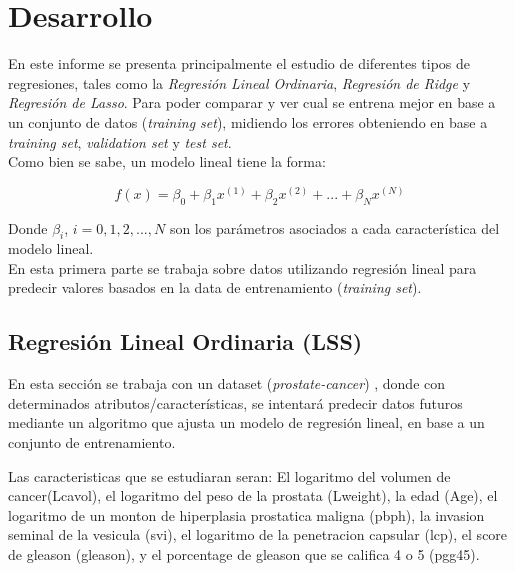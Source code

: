\documentclass[10pt]{article}
\begin{document}
\section*{Desarrollo}
En este informe se presenta principalmente el estudio de diferentes tipos de regresiones, tales como la \textit{Regresión Lineal Ordinaria}, \textit{Regresión de Ridge} y \textit{Regresión de Lasso}. Para poder comparar y ver cual se entrena mejor en base a un conjunto de datos (\textit{training set}), midiendo los errores obteniendo en base a \textit{training set}, \textit{validation set} y \textit{test set}.\\

Como bien se sabe, un modelo lineal tiene la forma:

\begin{equation}
f(x) = \beta_0 + \beta_1 x^{(1)} + \beta_2 x^{(2)} + ... + \beta_N x^{(N)}
\label{f_rlineal}
\end{equation}

Donde $\beta_i$, $i = 0, 1, 2,..., N$ son los parámetros asociados a cada característica del modelo lineal.\\

En esta primera parte se trabaja sobre datos utilizando regresión lineal para predecir valores basados en la data de entrenamiento (\textit{training set}).

\subsection{Regresión Lineal Ordinaria (LSS)}

En esta sección se trabaja con un dataset (\textit{prostate-cancer}) \cite{friedman2001elements}, donde con determinados atributos/características, se intentará predecir datos futuros mediante un algoritmo que ajusta un modelo de regresión lineal, en base a un conjunto de entrenamiento.

Las caracteristicas que se estudiaran seran: El logaritmo del volumen de cancer(Lcavol), el logaritmo del peso de la prostata (Lweight), la edad (Age), el logaritmo de un monton de hiperplasia prostatica maligna (pbph), la invasion seminal de la vesicula (svi), el logaritmo de la penetracion capsular (lcp), el score de gleason (gleason), y el porcentage de gleason que se califica 4 o 5 (pgg45).
\end{document}
